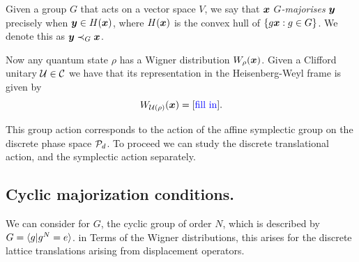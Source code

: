 \documentclass[pra,
aps,
twocolumn,
superscriptaddress,
groupedaddress,
nofootinbib,
reprint
]{revtex4-1}
\begin{document}
\begin{definition} Given a group $G$ that acts on a vector space $V$, we say that $\bmx$ \emph{$G$-majorises} $\bmy$ precisely when $\y \in H(\x)$, where $H(\x)$ is the convex hull of $\{g \x : g \in G\}$. We denote this as $\y \prec_G \x$.
\end{definition}

Now any quantum state $\rho$ has a Wigner distribution $W_\rho(\x)$. Given a Clifford unitary $\U \in \C$ we have that its representation in the Heisenberg-Weyl frame is given by
\begin{equation}
W_{\U(\rho)} (\x) = [\mbox{\ddd{fill in}}].
\end{equation}

This group action corresponds to the action of the affine symplectic group on the discrete phase space $\P_d$. To proceed we can study the discrete translational action, and the symplectic action separately.

\subsection{Cyclic majorization conditions.}
We can consider for $G$, the cyclic group of order $N$, which is described by $G= \< g | g^N = e\>$. in Terms of the Wigner distributions, this arises for the discrete lattice translations arising from displacement operators.
\end{document}
